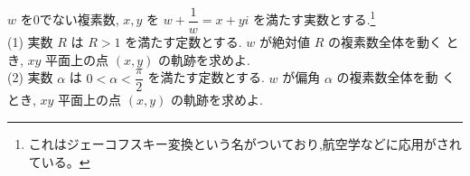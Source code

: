 $w$ を0でない複素数, $x,y$ を $w+\dfrac{1}{w}=x+yi$ を満たす実数とする.\footnote{これはジェーコフスキー変換という名がついており,航空学などに応用がされている。}\\
(1) 実数 $R$ は $R>1$ を満たす定数とする. $w$ が絶対値 $R$ の複素数全体を動く
\indent とき, $xy$ 平面上の点 $(x,y)$ の軌跡を求めよ.\\
(2) 実数 $\alpha$ は $0<\alpha<\dfrac{\pi}{2}$ を満たす定数とする. $w$ が偏角 $\alpha$ の複素数全体を動
\indent くとき, $xy$ 平面上の点 $(x,y)$ の軌跡を求めよ.\\
\enthm
